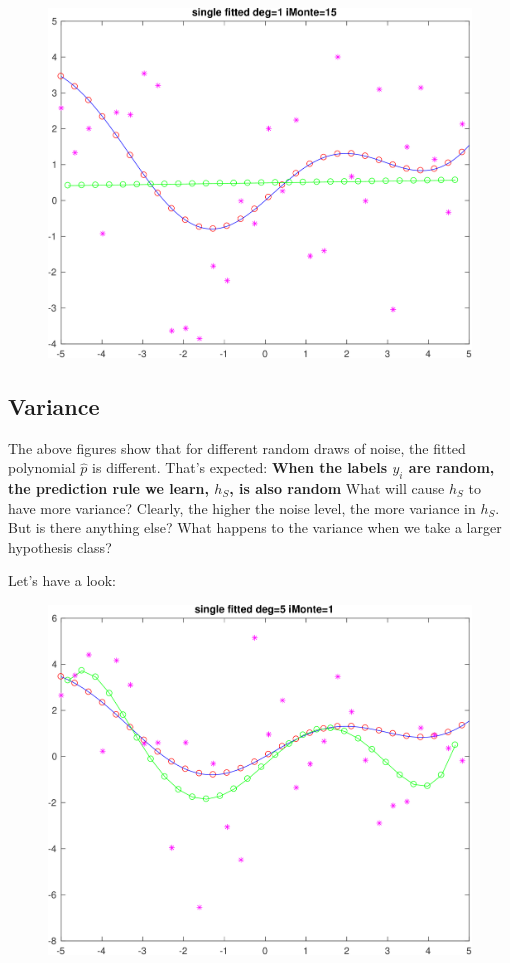 \begin{figure}[h!]
\centering\includegraphics[scale=0.1]{single_poly_d_1_iMonte_15.png}
\end{figure}



\newpage
\subsection{Variance}
The above figures show that for different random draws of noise, the fitted polynomial $\hat{p}$ is different.  That's expected: {\bf When the labels $y_i$ are random, the prediction rule we learn, $h_S$, is also random}
What will cause $h_S$ to have more variance?  Clearly, the higher the noise level, the more variance in $h_S$. But is there anything else? What happens to the variance when we take a larger hypothesis class?

Let's have a look:




\begin{figure}[h!]
\centering\includegraphics[scale=0.1]{single_poly_d_5_iMonte_1.png}
\end{figure}

